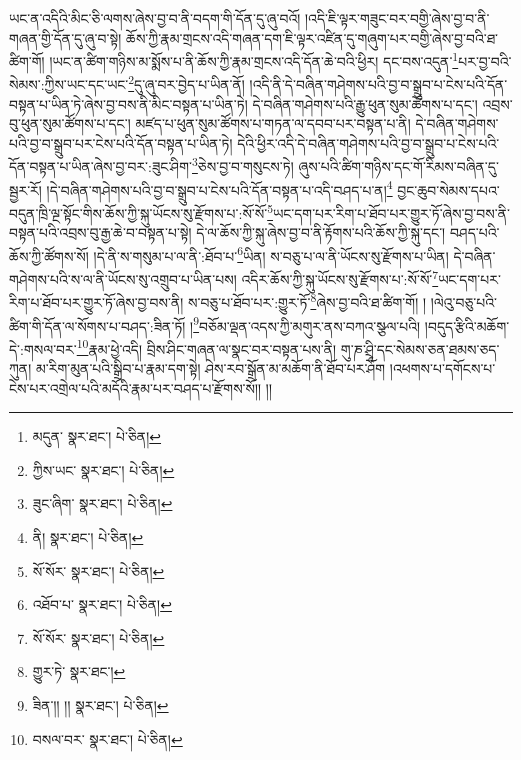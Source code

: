 ཡང་ན་འདིའི་མིང་ཅི་ལགས་ཞེས་བྱ་བ་ནི་བདག་གི་དོན་དུ་ཞུ་བའོ། །འདི་ཇི་ལྟར་གཟུང་བར་བགྱི་ཞེས་བྱ་བ་ནི་གཞན་གྱི་དོན་དུ་ཞུ་བ་སྟེ། ཆོས་ཀྱི་རྣམ་གྲངས་འདི་གཞན་དག་ཇི་ལྟར་འཛིན་དུ་གཞུག་པར་བགྱི་ཞེས་བྱ་བའི་ཐ་ཚིག་གོ། །ཡང་ན་ཚིག་གཉིས་མ་སྨོས་པ་ནི་ཆོས་ཀྱི་རྣམ་གྲངས་འདི་དོན་ཆེ་བའི་ཕྱིར། དང་བས་འདུན་\footnote{མདུན་  སྣར་ཐང་།  པེ་ཅིན། }པར་བྱ་བའི་སེམས་:ཀྱིས་ཡང་དང་ཡང་\footnote{ཀྱིས་ཡང་  སྣར་ཐང་།  པེ་ཅིན། }དུ་ཞུ་བར་བྱེད་པ་ཡིན་ནོ། །འདི་ནི་དེ་བཞིན་གཤེགས་པའི་བྱ་བ་སྒྲུབ་པ་ངེས་པའི་དོན་བསྟན་པ་ཡིན་ཏེ་ཞེས་བྱ་བས་ནི་མིང་བསྟན་པ་ཡིན་ཏེ། དེ་བཞིན་གཤེགས་པའི་རྒྱུ་ཕུན་སུམ་ཚོགས་པ་དང་། འབྲས་བུ་ཕུན་སུམ་ཚོགས་པ་དང་། མཛད་པ་ཕུན་སུམ་ཚོགས་པ་གཏན་ལ་དབབ་པར་བསྟན་པ་ནི། དེ་བཞིན་གཤེགས་པའི་བྱ་བ་སྒྲུབ་པར་ངེས་པའི་དོན་བསྟན་པ་ཡིན་ཏེ། དེའི་ཕྱིར་འདི་དེ་བཞིན་གཤེགས་པའི་བྱ་བ་སྒྲུབ་པ་ངེས་པའི་དོན་བསྟན་པ་ཡིན་ཞེས་བྱ་བར་:ཟུང་ཤིག་\footnote{ཟུང་ཞིག་  སྣར་ཐང་།  པེ་ཅིན། }ཅེས་བྱ་བ་གསུངས་ཏེ། ཞུས་པའི་ཚིག་གཉིས་དང་གོ་རིམས་བཞིན་དུ་སྦྱར་རོ། །དེ་བཞིན་གཤེགས་པའི་བྱ་བ་སྒྲུབ་པ་ངེས་པའི་དོན་བསྟན་པ་འདི་བཤད་པ་ན།\footnote{ནི།  སྣར་ཐང་།  པེ་ཅིན། } བྱང་ཆུབ་སེམས་དཔའ་བདུན་ཁྲི་ལྔ་སྟོང་གིས་ཆོས་ཀྱི་སྐུ་ཡོངས་སུ་རྫོགས་པ་:སོ་སོ་\footnote{སོ་སོར་  སྣར་ཐང་།  པེ་ཅིན། }ཡང་དག་པར་རིག་པ་ཐོབ་པར་གྱུར་ཏོ་ཞེས་བྱ་བས་ནི་བསྟན་པའི་འབྲས་བུ་རྒྱ་ཆེ་བ་བསྟན་པ་སྟེ། དེ་ལ་ཆོས་ཀྱི་སྐུ་ཞེས་བྱ་བ་ནི་རྟོགས་པའི་ཆོས་ཀྱི་སྐུ་དང་། བཤད་པའི་ཆོས་ཀྱི་ཚོགས་སོ། །དེ་ནི་ས་གསུམ་པ་ལ་ནི་:ཐོབ་པ་\footnote{འཐོབ་པ་  སྣར་ཐང་།  པེ་ཅིན། }ཡིན། ས་བཅུ་པ་ལ་ནི་ཡོངས་སུ་རྫོགས་པ་ཡིན། དེ་བཞིན་གཤེགས་པའི་ས་ལ་ནི་ཡོངས་སུ་འགྲུབ་པ་ཡིན་པས། འདིར་ཆོས་ཀྱི་སྐུ་ཡོངས་སུ་རྫོགས་པ་:སོ་སོ་\footnote{སོ་སོར་  སྣར་ཐང་།  པེ་ཅིན། }ཡང་དག་པར་རིག་པ་ཐོབ་པར་གྱུར་ཏོ་ཞེས་བྱ་བས་ནི། ས་བཅུ་པ་ཐོབ་པར་:གྱུར་ཏོ་\footnote{གྱུར་ཏེ་  སྣར་ཐང་། }ཞེས་བྱ་བའི་ཐ་ཚིག་གོ། ། །ལེའུ་བཅུ་པའི་ཚིག་གི་དོན་ལ་སོགས་པ་བཤད་:ཟིན་ཏོ། །\footnote{ཟིན་།། །།  སྣར་ཐང་།  པེ་ཅིན། }བཅོམ་ལྡན་འདས་ཀྱི་མགུར་ནས་བཀའ་སྩལ་པའི། །བདུད་རྩིའི་མཆོག་དེ་:གསལ་བར་\footnote{བསལ་བར་  སྣར་ཐང་།  པེ་ཅིན། }རྣམ་ཕྱེ་འདི། བྲིས་ཤིང་གཞན་ལ་སྣང་བར་བསྟན་པས་ནི། གུ་ཎ་ཤྲཱི་དང་སེམས་ཅན་ཐམས་ཅད་ཀུན། མ་རིག་མུན་པའི་སྒྲིབ་པ་རྣམ་དག་སྟེ། ཤེས་རབ་སྒྲོན་མ་མཆོག་ནི་ཐོབ་པར་ཤོག །འཕགས་པ་དགོངས་པ་ངེས་པར་འགྲེལ་པའི་མདོའི་རྣམ་པར་བཤད་པ་རྫོགས་སོ།། །།